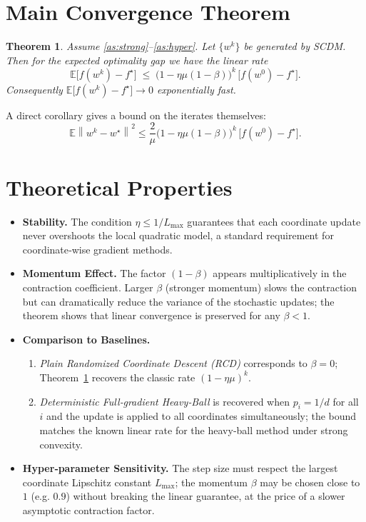 \documentclass[11pt]{article}
\newtheorem{theorem}{Theorem}
\newcommand{\E}{\mathbb{E}}
\newcommand{\norm}[1]{\left\|#1\right\|}
\begin{document}
\section*{Main Convergence Theorem}
\begin{theorem}\label{thm:linear}
Assume \ref{as:strong}–\ref{as:hyper}.  
Let $\{w^{k}\}$ be generated by SCDM.  Then for the expected optimality gap we have the linear rate
\[
\boxed{
\E\!\bigl[f(w^{k})-f^{\star}\bigr]\;\le\;
\bigl(1-\eta\mu(1-\beta)\bigr)^{k}\,
\bigl[f(w^{0})-f^{\star}\bigr] .
}
\]
Consequently $\E\!\bigl[f(w^{k})-f^{\star}\bigr]\to0$ exponentially fast.
\end{theorem}

A direct corollary gives a bound on the iterates themselves:
\[
\E\!\norm{w^{k}-w^{\star}}^{2}\le
\frac{2}{\mu}\bigl(1-\eta\mu(1-\beta)\bigr)^{k}\,
\bigl[f(w^{0})-f^{\star}\bigr].
\]

\section*{Theoretical Properties}
\begin{itemize}[leftmargin=*]
\item \textbf{Stability.} The condition $\eta\le 1/L_{\max}$ guarantees that each coordinate update never overshoots the local quadratic model, a standard requirement for coordinate‑wise gradient methods.
\item \textbf{Momentum Effect.} The factor $(1-\beta)$ appears multiplicatively in the contraction coefficient. Larger $\beta$ (stronger momentum) slows the contraction but can dramatically reduce the variance of the stochastic updates; the theorem shows that linear convergence is preserved for any $\beta<1$.
\item \textbf{Comparison to Baselines.}
    \begin{enumerate}
        \item \emph{Plain Randomized Coordinate Descent (RCD)} corresponds to $\beta=0$; Theorem~\ref{thm:linear} recovers the classic rate $ (1-\eta\mu)^{k}$.
        \item \emph{Deterministic Full‑gradient Heavy‑Ball} is recovered when $p_i=1/d$ for all $i$ and the update is applied to all coordinates simultaneously; the bound matches the known linear rate for the heavy‑ball method under strong convexity.
    \end{enumerate}
\item \textbf{Hyper‑parameter Sensitivity.} The step size must respect the largest coordinate Lipschitz constant $L_{\max}$; the momentum $\beta$ may be chosen close to $1$ (e.g. $0.9$) without breaking the linear guarantee, at the price of a slower asymptotic contraction factor.
\end{itemize}
\end{document}
